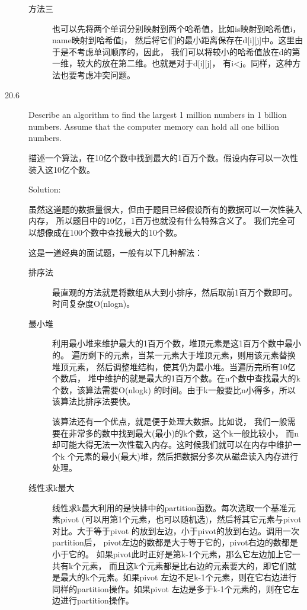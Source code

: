 \begin{description}
\begin{description}
\item[方法三] 也可以先将两个单词分别映射到两个哈希值，比如is映射到哈希值i，name映射到哈希值j， 然后将它们的最小距离保存在d[i][j]中。这里由于是不考虑单词顺序的，因此， 我们可以将较小的哈希值放在d的第一维，较大的放在第二维。也就是对于d[i][j]， 有i<j。同样，这种方法也要考虑冲突问题。
\end{description}



\item[20.6] Describe an algorithm to find the largest 1 million numbers in 1 billion numbers. Assume that the computer memory can hold all one billion numbers.

描述一个算法，在10亿个数中找到最大的1百万个数。假设内存可以一次性装入这10亿个数。

Solution:

虽然这道题的数据量很大，但由于题目已经假设所有的数据可以一次性装入内存， 所以题目中的10亿，1百万也就没有什么特殊含义了。 我们完全可以想像成在100个数中查找最大的10个数。

这是一道经典的面试题，一般有以下几种解法：
\begin{description}
\item[排序法] 

最直观的方法就是将数组从大到小排序，然后取前1百万个数即可。时间复杂度O(nlogn)。
\item[最小堆] 

利用最小堆来维护最大的1百万个数，堆顶元素是这1百万个数中最小的。 遍历剩下的元素，当某一元素大于堆顶元素，则用该元素替换堆顶元素， 然后调整堆结构，使其仍为最小堆。当遍历完所有10亿个数后， 堆中维护的就是最大的1百万个数。在n个数中查找最大的k个数，该算法需要O(nlogk) 的时间。由于k一般要比n小得多，所以该算法比排序法要快。

该算法还有一个优点，就是便于处理大数据。比如说， 我们一般需要在非常多的数中找到最大(最小)的k个数，这个k一般比较小， 而n却可能大得无法一次性载入内存。这时候我们就可以在内存中维护一个k 个元素的最小(最大)堆，然后把数据分多次从磁盘读入内存进行处理。

\item[线性求k最大] 

线性求k最大利用的是快排中的partition函数。每次选取一个基准元素pivot (可以用第1个元素，也可以随机选)，然后将其它元素与pivot对比。大于等于pivot 的放到左边，小于pivot的放到右边。调用一次partition后， pivot左边的数都是大于等于它的，pivot右边的数都是小于它的。 如果pivot此时正好是第k-1个元素，那么它左边加上它一共有k个元素， 而且这k个元素都是比右边的元素要大的，即它们就是最大的k个元素。如果pivot 左边不足k-1个元素，则在它右边进行同样的partition操作。如果pivot 左边是多于k-1个元素的，则在它左边进行partition操作。


\end{description}
\end{description}
